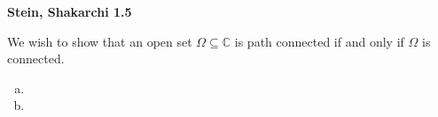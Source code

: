 \textbf{Stein, Shakarchi 1.5}

We wish to show that an open set $\Omega \subseteq \mathbb{C}$ is path connected if and only if $\Omega$ is connected.

\begin{enumerate}[(a)]
    \item 
    \pagebreak
    \item 
\end{enumerate}
